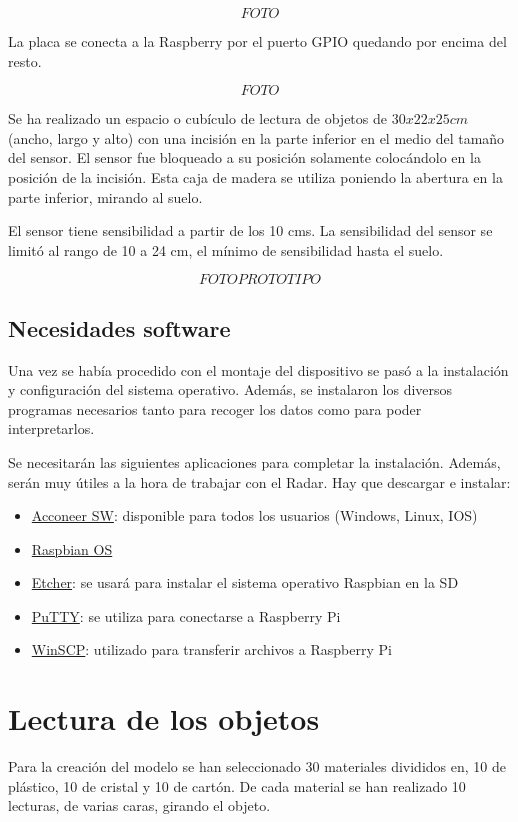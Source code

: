 $$FOTO$$

La placa se conecta a la Raspberry por el puerto GPIO quedando por encima del resto.

$$FOTO$$


Se ha realizado un espacio o cubículo de lectura de objetos de $30x22x25 cm$ (ancho, largo y alto) con una incisión en la parte inferior en el medio del tamaño del sensor. El sensor fue bloqueado a su posición solamente colocándolo en la posición de la incisión. Esta caja de madera se utiliza poniendo la abertura en la parte inferior, mirando al suelo.
 
El sensor tiene sensibilidad a partir de los 10 cms. La sensibilidad del sensor se limitó al rango de 10 a 24 cm, el mínimo de sensibilidad hasta el suelo.

$$FOTO PROTOTIPO$$

\subsection{Necesidades software}

Una vez se había procedido con el montaje del dispositivo se pasó a la instalación y configuración del sistema operativo. Además, se instalaron los diversos programas necesarios tanto para recoger los datos como para poder interpretarlos.

Se necesitarán las siguientes aplicaciones para completar la instalación. Además, serán muy útiles a la hora de trabajar con el Radar. 
Hay que descargar e instalar: 
\begin{itemize}
\item \href{http://developer.acconeer.com}{Acconeer SW}: disponible para todos los usuarios (Windows, Linux, IOS) 
\item \href{www.raspberrypi.org}{Raspbian OS} 
\item \href{http://www.etcher.io}{Etcher}: se usará para instalar el sistema operativo Raspbian en la SD
\item 
\href{http://www.putty.org}{PuTTY}: se utiliza para conectarse a Raspberry Pi
\item \href{http://www.winscp.net}{WinSCP}: utilizado para transferir archivos a Raspberry Pi
\end{itemize}
 
\section{Lectura de los objetos}

Para la creación del modelo se han seleccionado 30 materiales divididos en, 10 de plástico, 10 de cristal y 10 de cartón. De cada material se han realizado 10 lecturas, de varias caras, girando el objeto.

